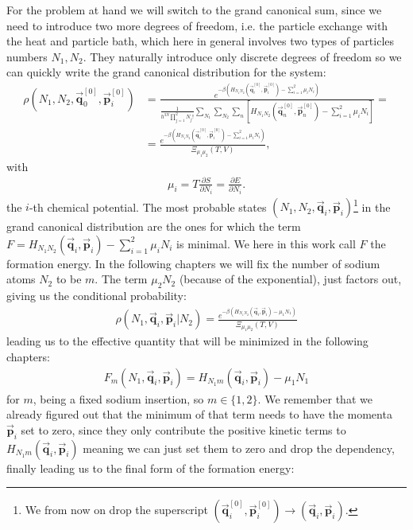For the problem at hand we will switch to the grand canonical sum, since we need to introduce two more degrees of freedom, i.e. the particle exchange with the heat and particle bath, which here in general involves two types of particles numbers $N_1,N_2$. They naturally introduce only discrete degrees of freedom so we can quickly write the grand canonical distribution for the system:
\begin{align}
	\rho(N_1,N_2,\vec{\mathbf{q}}_{0}^{[0]},\vec{\mathbf{p}}_{i}^{[0]})&=\frac{e^{-\beta\left(H_{N_1N_2}(\vec{\mathbf{q}}_{i}^{[0]},\vec{\mathbf{p}}_{i}^{[0]})-\sum_{i=1}^{2}\mu_i N_i\right)}}{\frac{1}{h^{3N}\prod_{j=1}^{2}N_j!}\sum_{N_1}\sum_{N_2}\sum_{n}\left[H_{N_1N_2}(\vec{\mathbf{q}}_{n}^{[0]},\vec{\mathbf{p}}_{n}^{[0]})-\sum_{i=1}^{2}\mu_i N_i\right]}=\\
	&=\frac{e^{-\beta\left(H_{N_1N_2}(\vec{\mathbf{q}}_{i}^{[0]},\vec{\mathbf{p}}_{i}^{[0]})-\sum_{i=1}^{2}\mu_i N_i\right)}}{\Xi_{\mu_1\mu_2}(T,V)},
\end{align}
with 
\begin{align}
\mu_i = T \frac{\partial S}{\partial N_i}=\frac{\partial E}{\partial N_i}.
\end{align} the $i$-th chemical potential.
The most probable states $(N_1,N_2,\vec{\mathbf{q}}_{i},\vec{\mathbf{p}}_{i})$\footnote{We from now on drop the superscript $(\vec{\mathbf{q}}_{i}^{[0]},\vec{\mathbf{p}}_{i}^{[0]}) \rightarrow (\vec{\mathbf{q}}_{i},\vec{\mathbf{p}}_{i})$.} in the grand canonical distribution are the ones for which the term $F = H_{N_1N_2}(\vec{\mathbf{q}}_i,\vec{\mathbf{p}}_i)-\sum_{i=1}^{2}\mu_i N_i$ is minimal. We here in this work call $F$ the formation energy. In the following chapters we will fix the number of sodium atoms $N_2$ to be $m$. The term $\mu_2 N_2$ (because of the exponential), just factors out, giving us the conditional probability:
\begin{align}
	\rho(N_1,\vec{\mathbf{q}}_{i},\vec{\mathbf{p}}_{i}|N_2)=\frac{e^{-\beta\left(H_{N_1N_2}(\vec{\mathbf{q}}_{i},\vec{\mathbf{p}}_{i})-\mu_1 N_1\right)}}{\Xi_{\mu_1\mu_2}(T,V)}
\end{align}
leading us to the effective quantity that will be minimized in the following chapters:
\begin{align}
	F_m(N_1,\vec{\mathbf{q}}_{i},\vec{\mathbf{p}}_{i}) = H_{N_1m}(\vec{\mathbf{q}}_{i},\vec{\mathbf{p}}_{i}) - \mu_1 N_1
\end{align}for $m$, being a fixed sodium insertion, so $m\in\{1,2\}$. We remember that we already figured out that the minimum of that term needs to have the momenta $\vec{\mathbf{p}}_i$ set to zero, since they only contribute the positive kinetic terms to $H_{N_1m}(\vec{\mathbf{q}}_{i},\vec{\mathbf{p}}_{i})$ meaning we can just set them to zero and drop the dependency, finally leading us to the final form of the formation energy:

